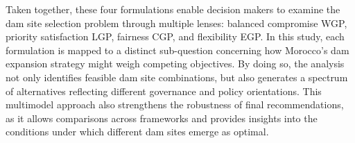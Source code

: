 Taken together, these four formulations enable decision makers to examine the dam site selection problem through multiple lenses: balanced compromise \gls{WGP}, priority satisfaction \gls{LGP}, fairness \gls{CGP}, and flexibility \gls{EGP}. In this study, each formulation is mapped to a distinct sub-question concerning how Morocco's dam expansion strategy might weigh competing objectives. By doing so, the analysis not only identifies feasible dam site combinations, but also generates a spectrum of alternatives reflecting different governance and policy orientations. This multimodel approach also strengthens the robustness of final recommendations, as it allows comparisons across frameworks and provides insights into the conditions under which different dam sites emerge as optimal.